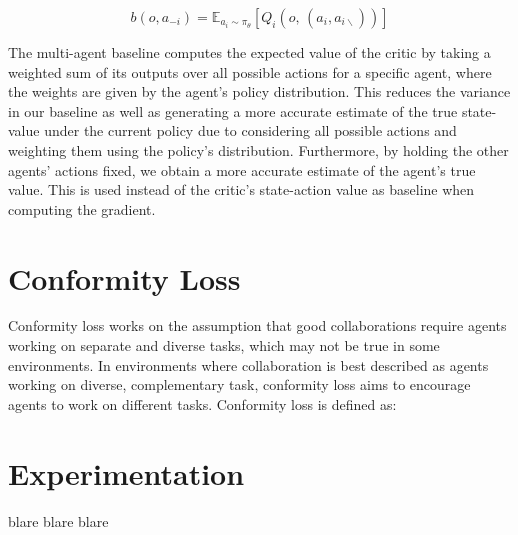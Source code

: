 \documentclass[conference]{IEEEtran}
\begin{document}
\begin{equation}
b(o, a_{-i}) = \mathbb{E}_{a_i \sim \pi_\theta}\left[ Q_{i} \left( o, \, (a_i, a_{i\backslash}) \right) \right]
\end{equation}

The multi-agent baseline computes the expected value of the critic by taking a weighted sum of its outputs over all possible actions for a specific agent, where the weights are given by the agent’s policy distribution.
This reduces the variance in our baseline as well as generating a more accurate estimate of the true state-value under the current policy due to considering all possible actions and weighting them using the policy's distribution.
Furthermore, by holding the other agents' actions fixed, we obtain a more accurate estimate of the agent's true value. This is used instead of the critic's state-action value as baseline when computing the gradient.


\section{Conformity Loss}
Conformity loss works on the assumption that good collaborations require agents working on separate and diverse tasks, which may not be true in some environments. 
In environments where collaboration is best described as agents working on diverse, complementary task, conformity loss aims to encourage agents to work on different tasks.
Conformity loss is defined as:









\section{Experimentation}
\noindent blare blare blare

\end{document}
